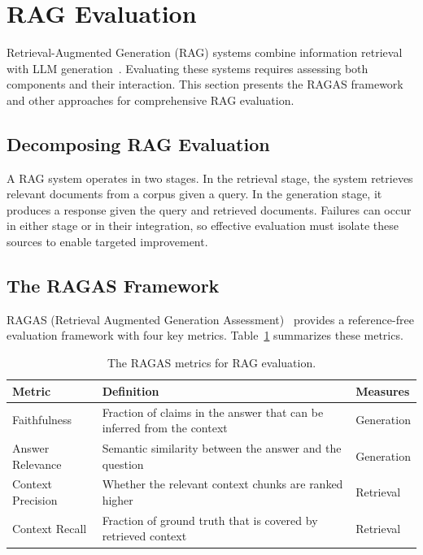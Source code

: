 
\section{RAG Evaluation}
\label{sec:rag-evaluation}

Retrieval-Augmented Generation (RAG) systems combine information retrieval with LLM generation~\citep{lewis2020retrieval}. Evaluating these systems requires assessing both components and their interaction. This section presents the RAGAS framework and other approaches for comprehensive RAG evaluation.

\subsection{Decomposing RAG Evaluation}

A RAG system operates in two stages. In the retrieval stage, the system retrieves relevant documents from a corpus given a query. In the generation stage, it produces a response given the query and retrieved documents. Failures can occur in either stage or in their integration, so effective evaluation must isolate these sources to enable targeted improvement.

\subsection{The RAGAS Framework}

RAGAS (Retrieval Augmented Generation Assessment)~\citep{es2024ragas} provides a reference-free evaluation framework with four key metrics. Table~\ref{tab:ragas-metrics} summarizes these metrics.

\begin{table}[h]
\centering
\caption{The RAGAS metrics for RAG evaluation.}
\label{tab:ragas-metrics}
\begin{tabular}{@{}lp{7cm}l@{}}
\toprule
\textbf{Metric} & \textbf{Definition} & \textbf{Measures} \\
\midrule
Faithfulness & Fraction of claims in the answer that can be inferred from the context & Generation \\
\addlinespace
Answer Relevance & Semantic similarity between the answer and the question & Generation \\
\addlinespace
Context Precision & Whether the relevant context chunks are ranked higher & Retrieval \\
\addlinespace
Context Recall & Fraction of ground truth that is covered by retrieved context & Retrieval \\
\bottomrule
\end{tabular}
\end{table}

